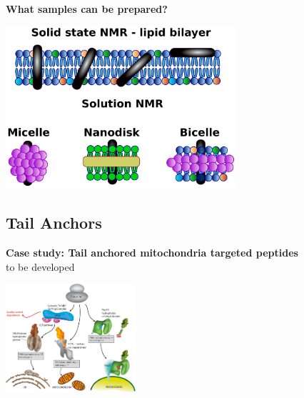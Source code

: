 \documentclass{beamer}
\begin{document}
\addtocounter{framenumber}{-1}
\begin{frame}
\begin{center}
\Large{\centering
\textbf{What samples can be prepared?} \\}

\vspace{0.5cm}

\includegraphics[height=6cm]{plots/samples1.pdf}
\end{center}
\end{frame}





\subsection{Tail Anchors}


\begin{frame}
\Large{\centering
\textbf{Case study: Tail anchored mitochondria targeted peptides} \\
to be developed
\begin{center}
 \includegraphics[height=4cm]{organels.pdf}
\end{center}
}
\end{frame}
\end{document}
